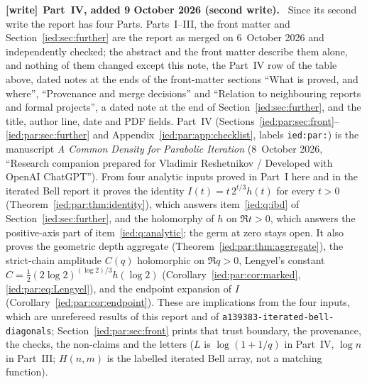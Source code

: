 \documentclass[11pt,letterpaper]{article}
\theoremstyle{remark}\newtheorem{remark}[theorem]{Remark}
\newcommand{\file}[1]{\nolinkurl{#1}}
\newenvironment{writenote}[1][]{\par\smallskip\begingroup\small
 \noindent\textbf{[write]}\if\relax\detokenize{#1}\relax\else~\textbf{#1.}\fi\ }%
 {\par\endgroup\smallskip}
\begin{document}
\begin{writenote}[Part~IV, added 9 October 2026 (second write)]
Since its second write the report has four Parts. Parts~I--III, the front
matter and Section~\ref{ied:sec:further} are the report as merged on
6~October 2026 and independently checked; the abstract and the front matter
describe them alone, and nothing of them changed except this note, the
Part~IV row of the table above, dated notes at the ends of the front-matter
sections ``What is proved, and where'', ``Provenance and merge decisions''
and ``Relation to neighbouring reports and formal projects'', a dated note at
the end of Section~\ref{ied:sec:further}, and the title, author line, date and
PDF fields. Part~IV (Sections~\ref{ied:par:sec:front}--\ref{ied:par:sec:further}
and Appendix~\ref{ied:par:app:checklist}, labels \file{ied:par:}) is the
manuscript \emph{A Common Density for Parabolic Iteration} (8~October 2026,
``Research companion prepared for Vladimir Reshetnikov / Developed with
OpenAI ChatGPT''). From four analytic inputs proved in Part~I here and in the
iterated Bell report it proves the identity
$I(t)=t\,2^{t/3}h(t)$ for every $t>0$ (Theorem~\ref{ied:par:thm:identity}),
which answers item~\ref{ied:q:ibd} of Section~\ref{ied:sec:further}, and the
holomorphy of $h$ on $\Re t>0$, which answers the positive-axis part of
item~\ref{ied:q:analytic}; the germ at zero stays open. It also proves the
geometric depth aggregate (Theorem~\ref{ied:par:thm:aggregate}), the
strict-chain amplitude $C(q)$ holomorphic on $\Re q>0$, Lengyel's constant
$C=\frac12(2\log2)^{(\log2)/3}h(\log2)$ (Corollary~\ref{ied:par:cor:marked},
\eqref{ied:par:eq:Lengyel}), and the endpoint expansion of $I$
(Corollary~\ref{ied:par:cor:endpoint}). These are implications from the four
inputs, which are unrefereed results of this report and of
\file{a139383-iterated-bell-diagonals}; Section~\ref{ied:par:sec:front} prints
that trust boundary, the provenance, the checks, the non-claims and the
letters ($L$ is $\log(1+1/q)$ in Part~IV, $\log n$ in Part~III; $H(n,m)$ is the
labelled iterated Bell array, not a matching function).
\end{writenote}
\end{document}
